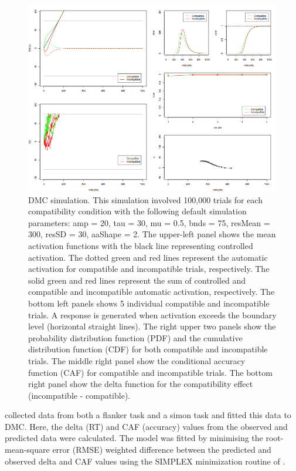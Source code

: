 \begin{figure}
    \includegraphics[width=1\textwidth]{../figures/figure1.png}
    \caption{
        DMC simulation. This simulation involved 100,000 trials for each
        compatibility condition with the following default simulation
        parameters: amp = 20, tau = 30, mu = 0.5, bnds = 75, resMean = 300,
        resSD = 30, aaShape = 2. The upper-left panel shows the mean activation
        functions with the black line representing controlled activation. The
        dotted green and red lines represent the automatic activation for
        compatible and incompatible trials, respectively. The solid green and
        red lines represent the sum of controlled and compatible and
        incompatible automatic activation, respectively. The bottom left panels
        shows 5 individual compatible and incompatible trials. A response is
        generated when activation exceeds the boundary level (horizontal
        straight lines). The right upper two panels show the probability
        distribution function (PDF) and the cumulative distribution function
        (CDF) for both compatible and incompatible trials. The middle right
        panel show the conditional accuracy function (CAF) for compatible and
        incompatible trials. The bottom right panel show the delta function for
        the compatibility effect (incompatible - compatible).
    }
    \label{fig:1}
\end{figure}
\textcite{ulrich2015automatic} collected data from both a flanker task and a
simon task and fitted this data to DMC. Here, the delta (RT) and CAF (accuracy)
values from the observed and predicted data were calculated. The model was
fitted by minimising the root-mean-square error (RMSE) weighted difference
between the predicted and observed delta and CAF values using the SIMPLEX
minimization routine of \textcite{nelder1965simplex}.

